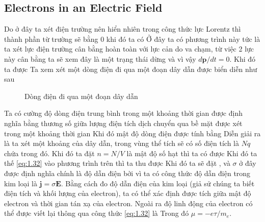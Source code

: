 \subsection{Electrons in an Electric Field}
Do ở đây ta xét điện trường nên hiển nhiên trong công thức lực Lorentz thì thành phần từ trường sẽ bằng 0 khi đó ta có
Ở đây ta có phương trình này tức là ta xét lực điện trường cân bằng hoàn toàn với lực cản do va chạm, từ việc 2 lực này cân bằng ta sẽ xem đây là một trạng thái dừng và vì vậy $d\mathbf{p}/dt = 0$. Khi đó ta được
Ta xem xét một dòng điện đi qua một đoạn dây dẫn được biển diễn như sau\\
\begin{figure}[H]
    \centering
    \caption{Dòng điện đi qua một đoạn dây dẫn}
    \label{fig:1.3}
\end{figure}
\noindent Ta có cường độ dòng điện trung bình trong một khoảng thời gian được định nghĩa bằng thương số giữa lượng điện tích dịch chuyển qua bề mặt được xét trong một khoảng thời gian
Khi đó mật độ dòng điện được tính bằng
Diễn giải ra là ta xét một khoảng của dây dẫn, trong vùng thể tích sẽ có số điện tích là $Nq$ chứa trong đó. Khi đó ta đặt $n = N/V$ là mật độ số hạt thì ta có được
Khi đó ta thế \eqref{eq:1.32} vào phương trình trên thì ta thu được
Khi đó ta sẽ đặt , và $\sigma$ ở đây được định nghĩa chính là độ dẫn điện bởi vì ta có công thức độ dẫn điện trong kim loại là $\mathbf{j} = \sigma \mathbf{E}$. 
Bằng cách đo độ dẫn điện của kim loại (giả sử chúng ta biết điện tích và khối lượng của electron), ta có thể xác định được tích giữa mật độ electron và thời gian tán xạ của electron.
Ngoài ra độ linh động của electron có thể được viết lại thông qua công thức \eqref{eq:1.32} là
Trong đó $\mu = -e\tau/m_e$.
